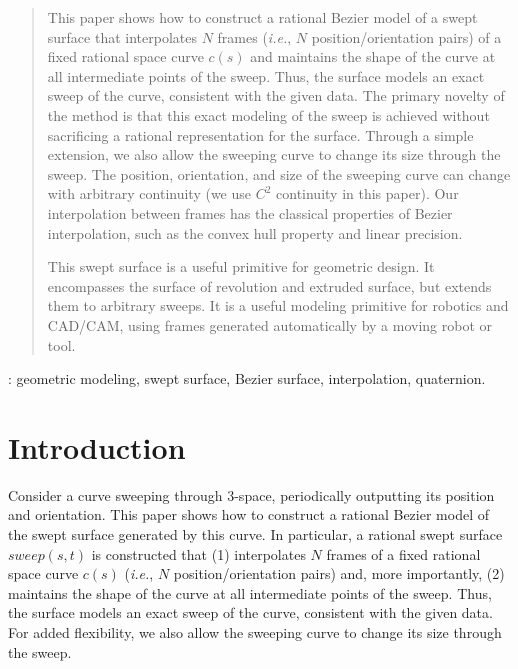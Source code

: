 \maketitle
\thispagestyle{empty}
\begin{abstract}
This paper shows how to construct a rational Bezier model of a swept
surface that interpolates
$N$ frames ({\em i.e.}, $N$ position/orientation pairs)
of a fixed rational space curve $c(s)$ 
and maintains the shape of the curve at all intermediate points 
of the sweep.
Thus, the surface models
an exact sweep of the curve, consistent with the given data.
The primary novelty of the method is that 
this exact modeling of the sweep is achieved
without sacrificing a rational representation for the surface.
Through a simple extension, we also allow the sweeping curve to change
its size through the sweep.
The position, orientation, and size of the sweeping curve can change with
arbitrary continuity (we use $C^2$ continuity in this paper).
Our interpolation between frames has the classical properties
of Bezier interpolation, such as the convex hull property and linear precision.

This swept surface is a useful primitive for geometric design.
It encompasses the surface of revolution and extruded surface, but extends
them to arbitrary sweeps.
It is a useful modeling primitive for robotics and CAD/CAM, using frames generated
automatically by a moving robot or tool.
\end{abstract}

\vspace{.1in}

: geometric modeling, swept surface, Bezier surface,
	  interpolation, quaternion.

\section{Introduction}

Consider a curve sweeping through 3-space,
periodically outputting its position and orientation.
This paper shows how to construct a rational Bezier model of the swept
surface generated by this curve.
In particular, a rational swept surface $sweep(s,t)$ is constructed that 
(1) interpolates
$N$ frames of a fixed rational space curve $c(s)$ ({\em i.e.}, $N$ position/orientation pairs) 
and, more importantly, (2) maintains the shape of the curve at all intermediate points 
of the sweep.
Thus, the surface models 
an exact sweep of the curve, consistent with the given data.
For added flexibility, we also allow the sweeping curve to change its
size through the sweep.

